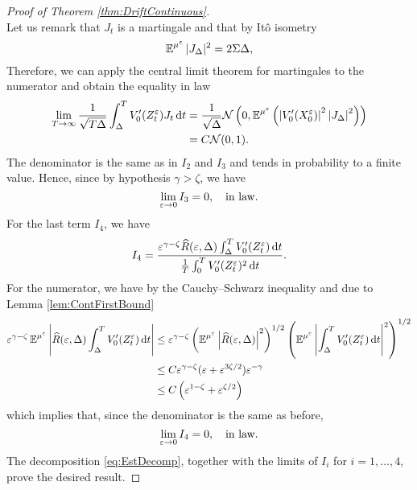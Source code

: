 \documentclass[10pt]{article}
\begin{document}
\begin{proof}[Proof of Theorem \ref{thm:DriftContinuous}]
\begin{equation}
	\end{equation}
	Let us remark that $J_t$ is a martingale and that by Itô isometry
	\begin{equation}
		\operatorname{\mathbb{E}}^{\mu^\varepsilon}|J_\Delta|^2 = 2\Sigma\Delta,
	\end{equation}
	Therefore, we can apply the central limit theorem for martingales to the numerator and obtain the equality in law
	\begin{equation}	
	\begin{aligned}
		\lim_{T\to\infty}\frac{1}{\sqrt{T\Delta}}\int_\Delta^T V_0'(Z^\varepsilon_t) J_t \,\mathrm{d} t &= \frac{1}{\sqrt{\Delta}} \mathcal N\left(0,\operatorname{\mathbb{E}}^{\mu^\varepsilon}\left(\left\lvert V_0'(X^\varepsilon_0)\right\rvert^2\left\lvert J_\Delta\right\rvert^2\right)\right) \\
		&= C \mathcal N(0, 1).
	\end{aligned}
	\end{equation}
	The denominator is the same as in $I_2$ and $I_3$ and tends in probability to a finite value. Hence, since by hypothesis $\gamma > \zeta$, we have
	\begin{equation}
		\lim_{\varepsilon \to 0} I_3 = 0, \quad \text{in law}.
	\end{equation}
	For the last term $I_4$, we have
	\begin{equation}
		I_4 = \frac{\varepsilon^{\gamma - \zeta}\widehat R(\varepsilon, \Delta)\int_\Delta^T V_0'(Z^\varepsilon_t) \,\mathrm{d} t}{\frac1T\int_0^T V_0'(Z^\varepsilon_t)^2 \,\mathrm{d} t}.
	\end{equation}
	For the numerator, we have by the Cauchy--Schwarz inequality and due to Lemma \ref{lem:ContFirstBound}
	\begin{equation}
	\begin{aligned}
		\varepsilon^{\gamma-\zeta}\operatorname{\mathbb{E}}^{\mu^\varepsilon}\left\lvert\widehat R(\varepsilon, \Delta)\int_\Delta^T V_0'(Z^\varepsilon_t) \,\mathrm{d} t\right\rvert &\leq 
		\varepsilon^{\gamma - \zeta} \left(\operatorname{\mathbb{E}}^{\mu^\varepsilon}\left\lvert\widehat R(\varepsilon, \Delta)\right\rvert^2\right)^{1/2}\left(\operatorname{\mathbb{E}}^{\mu^\varepsilon}\left\lvert\int_\Delta^T V_0'(Z^\varepsilon_t) \,\mathrm{d} t\right\rvert^2\right)^{1/2}\\
		&\leq C\varepsilon^{\gamma - \zeta}(\varepsilon + \varepsilon^{3\zeta/2}) \varepsilon^{-\gamma}\\
		&\leq C\left(\varepsilon^{1-\zeta} + \varepsilon^{\zeta/2}\right)
	\end{aligned}
	\end{equation}
	which implies that, since the denominator is the same as before,
	\begin{equation}
		\lim_{\varepsilon \to 0} I_4 = 0, \quad \text{in law}.
	\end{equation}
	The decomposition \eqref{eq:EstDecomp}, together with the limits of $I_i$ for $i = 1, \ldots, 4$, prove the desired result.
\end{proof}
\end{document}
